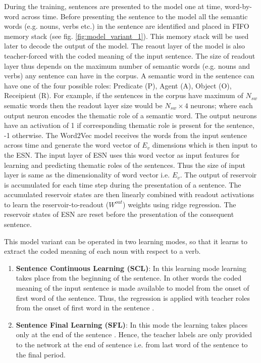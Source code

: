 During the training, sentences are presented to the model one at time, word-by-word across time. Before presenting the sentence to the model all the semantic words (e.g. nouns, verbs etc.) in the sentence are identified and placed in FIFO memory stack (see fig. \ref{fig:model_variant_1}). This memory stack will be used later to decode the output of the model. The reaout layer of the model is also teacher-forced with the coded meaning of the input sentence. The size of readout layer thus depends on the maximum number of semantic words (e.g. nouns and verbs) any sentence can have in the corpus. A semantic word in the sentence can have one of the four possible roles: Predicate (P), Agent (A), Object (O), Receipient (R). For example, if the sentences in the corpus have maximum of $N_{sw}$ sematic words then the readout layer size would be $N_{sw} \times 4 $ neurons; where each output neuron encodes the thematic role of a semantic word. The output neurons have an activation of 1 if corresponding thematic role is present for the sentence, -1 otherwise. The Word2Vec model receives the words from the input sentence across time and generate the word vector of $E_{v}$ dimensions which is then input to the ESN. The input layer of ESN uses this word vector as input features for learning and predicting thematic roles of the sentences. Thus the size of input layer is same as the dimensionality of word vector i.e. $E_{v}$. The output of reservoir is accumulated for each time step during the presentation of a sentence. The accumulated reservoir states are then linearly combined with readout activations to learn the reservoir-to-readout ($W^{out}$) weights using ridge regression. The reservoir states of ESN are reset before the presentation of the consequent sentence. 

This model variant can be operated in two learning modes, so that it learns to extract the coded meaning of each noun with respect to a verb.

\begin{enumerate}
\setlength{\itemsep}{\smallskipamount}

\item \textbf{Sentence Continuous Learning (SCL)}: In this learning mode learning takes place from the beginning of the sentence. In other words the coded meaning of the input sentence is made available to model from the onset of first word of the sentence. Thus, the regression is applied with teacher roles from the onset of first word in the sentence \cite{xavier:2013:RT}. \label{eg:SCL}

\item \textbf{Sentence Final Learning (SFL)}: In this mode the learning takes places only at the end of the sentence \cite{xavier:2013:RT}. Hence, the teacher labels are only provided to the network at the end of sentence i.e. from last word of the sentence to the final period. \label{eg:SFL}

\end{enumerate} 


